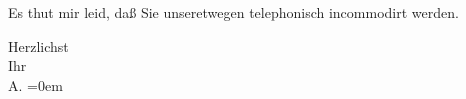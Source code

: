 \pstart
           Es thut mir leid, daß Sie unseretwegen telephonisch incommodirt werden.\pend
           
\pstart
           Herzlichst{\\[\baselineskip]}Ihr{\\[\baselineskip]}\spacefill\mbox{A.}\pend
           \leftskip=0em{}\endnumbering{}  \newcommand{\dateiname}{L01917}\newcommand{\titel}{Arthur Schnitzler an Richard Beer-Hofmann, 6. 3. 1910}\newcommand{\editorInnen}{Martin Anton Müller und Gerd-Hermann Susen}
